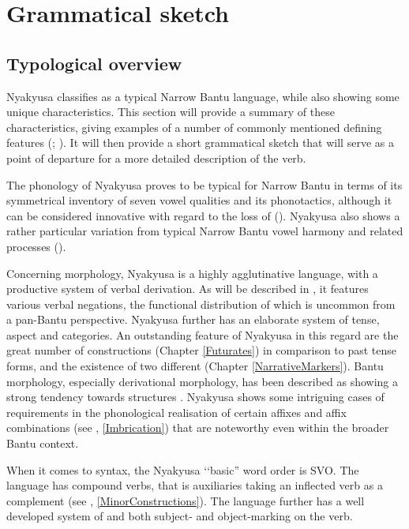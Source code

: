\chapter{Grammatical sketch}
\section{Typological overview}
Nyakyusa classifies as a typical Narrow Bantu language, while also showing some unique characteristics. This section will provide a summary of these characteristics, giving examples of a number of commonly mentioned defining features (\citealt{MoehligW1981}; \citealt{NurseDPhillipsonG2003a}). It will then provide a short grammatical sketch that will serve as a point of departure for a more detailed description of the verb.

The phonology of Nyakyusa proves to be typical for Narrow Bantu in terms of its symmetrical inventory of seven vowel qualities and its phonotactics, although it can be considered innovative with regard to the loss of  (). Nyakyusa also shows a rather particular variation from typical Narrow Bantu vowel harmony and related processes ().

Concerning morphology, Nyakyusa is a highly agglutinative language, with a productive system of verbal derivation. As will be described in , it features various verbal negations, the functional distribution of which is uncommon from a pan-Bantu perspective. Nyakyusa further has an elaborate system of tense, aspect and  categories. An outstanding feature of Nyakyusa in this regard are the great number of  constructions (Chapter \ref{Futurates}) in comparison to past tense forms, and the existence of two different  (Chapter \ref{NarrativeMarkers}). Bantu morphology, especially derivational morphology, has been described as showing a strong tendency towards  structures \citep{HymanL2002}. Nyakyusa shows some intriguing cases of  requirements in the phonological realisation of certain affixes and affix combinations (see , \ref{Imbrication}) that are noteworthy even within the broader Bantu context.

When it comes to syntax, the Nyakyusa \lq\lq basic'' word order is SVO. The language has compound verbs, that is auxiliaries taking an inflected verb as a complement (see , \ref{MinorConstructions}). The language further has a well developed system of  and both subject- and object-marking on the verb.

